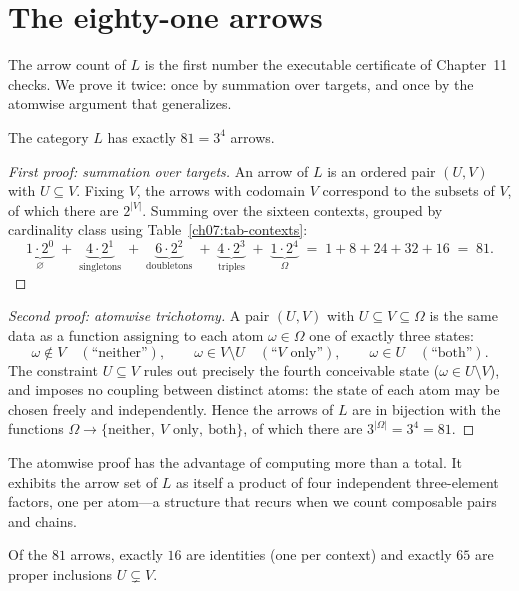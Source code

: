\section{The eighty-one arrows}\label{ch07:sec-arrows}

The arrow count of $L$ is the first number the executable certificate of Chapter~11 checks. We prove it twice: once by summation over targets, and once by the atomwise argument that generalizes.

\begin{theorem}\label{ch07:thm-81}
The category $L$ has exactly $81=3^{4}$ arrows.
\end{theorem}

\begin{proof}[First proof: summation over targets]
An arrow of $L$ is an ordered pair $(U,V)$ with $U\subseteq V$. Fixing $V$, the arrows with codomain $V$ correspond to the subsets of $V$, of which there are $2^{|V|}$. Summing over the sixteen contexts, grouped by cardinality class using Table~\ref{ch07:tab-contexts}:
\[
\underbrace{1\cdot 2^{0}}_{\varnothing}
\;+\;\underbrace{4\cdot 2^{1}}_{\text{singletons}}
\;+\;\underbrace{6\cdot 2^{2}}_{\text{doubletons}}
\;+\;\underbrace{4\cdot 2^{3}}_{\text{triples}}
\;+\;\underbrace{1\cdot 2^{4}}_{\Omega}
\;=\;1+8+24+32+16\;=\;81 .
\]
\end{proof}

\begin{proof}[Second proof: atomwise trichotomy]
A pair $(U,V)$ with $U\subseteq V\subseteq\Omega$ is the same data as a function assigning to each atom $\omega\in\Omega$ one of exactly three states:
\[
\omega\notin V \quad(\text{``neither''}),\qquad
\omega\in V\setminus U \quad(\text{``$V$ only''}),\qquad
\omega\in U \quad(\text{``both''}).
\]
The constraint $U\subseteq V$ rules out precisely the fourth conceivable state ($\omega\in U\setminus V$), and imposes no coupling between distinct atoms: the state of each atom may be chosen freely and independently. Hence the arrows of $L$ are in bijection with the functions $\Omega\to\{\text{neither},\ \text{$V$ only},\ \text{both}\}$, of which there are $3^{|\Omega|}=3^{4}=81$.
\end{proof}

The atomwise proof has the advantage of computing more than a total. It exhibits the arrow set of $L$ as itself a product of four independent three-element factors, one per atom---a structure that recurs when we count composable pairs and chains.

\begin{corollary}\label{ch07:cor-proper}
Of the $81$ arrows, exactly $16$ are identities (one per context) and exactly $65$ are proper inclusions $U\subsetneq V$.
\end{corollary}

